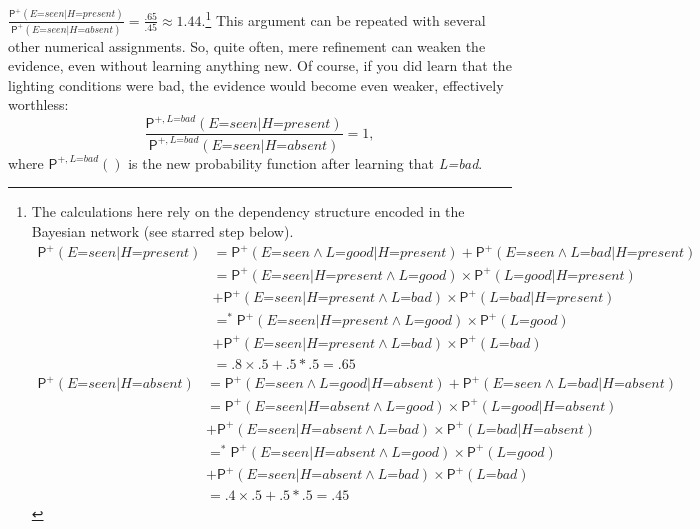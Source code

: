 \documentclass[
  11pt,
  dvipsnames,enabledeprecatedfontcommands]{scrartcl}
\newcommand{\ppr}[2]{\ensuremath{\mathsf{P}^{#1}(#2)}}
\begin{document}
\(\frac{\ppr{+}{\textit{E=seen} \vert \textit{H=present}}}{\ppr{+}{\textit{E=seen} \vert \textit{H=absent}}}=\frac{.65}{.45}\approx 1.44\).\footnote{The
  calculations here rely on the dependency structure encoded in the
  Bayesian network (see starred step below). \begin{align*}
  \ppr{+}{\textit{E=seen} \vert \textit{H=present}} &= \ppr{+}{\textit{E=seen} \wedge \textit{L=good} \vert \textit{H=present}}+\ppr{+}{\textit{E=seen} \wedge \textit{L=bad} \vert \textit{H=present}}\\
  &= \ppr{+}{\textit{E=seen} \vert \textit{H=present} \wedge \textit{L=good}}  \times \ppr{+}{\textit{L=good} \vert  \textit{H=present} }\\ & +\ppr{+}{\textit{E=seen}  \vert \textit{H=present} \wedge \textit{L=bad}} \times \ppr{+}{\textit{L=bad} \vert  \textit{H=present}}\\
  &=^* \ppr{+}{\textit{E=seen} \vert \textit{H=present} \wedge \textit{L=good}}  \times \ppr{+}{\textit{L=good}}\\ & +\ppr{+}{\textit{E=seen}  \vert \textit{H=present} \wedge \textit{L=bad}} \times \ppr{+}{\textit{L=bad}}\\
  &= .8 \times .5 +.5 *.5 = .65 
  \end{align*} \begin{align*}
  \ppr{+}{\textit{E=seen} \vert \textit{H=absent}} &= \ppr{+}{\textit{E=seen} \wedge \textit{L=good} \vert \textit{H=absent}}+\ppr{+}{\textit{E=seen} \wedge \textit{L=bad} \vert \textit{H=absent}}\\
  &= \ppr{+}{\textit{E=seen} \vert \textit{H=absent} \wedge \textit{L=good}}  \times \ppr{+}{\textit{L=good} \vert  \textit{H=absent} }\\ & +\ppr{+}{\textit{E=seen}  \vert \textit{H=absent} \wedge \textit{L=bad}} \times \ppr{+}{\textit{L=bad} \vert  \textit{H=absent}}\\
  &=^* \ppr{+}{\textit{E=seen} \vert \textit{H=absent} \wedge \textit{L=good}}  \times \ppr{+}{\textit{L=good}}\\ & +\ppr{+}{\textit{E=seen}  \vert \textit{H=absent} \wedge \textit{L=bad}} \times \ppr{+}{\textit{L=bad}}\\
  &= .4 \times .5 +.5 *.5 = .45 
  \end{align*}} This argument can be repeated with several other
numerical
assignments. So,
quite often, mere refinement can weaken the evidence, even without
learning anything new. Of course, if you did learn that the lighting
conditions were bad, the evidence would become even weaker, effectively
worthless:
\[\frac{\ppr{+, \textit{L=bad}}{\textit{E=seen} \vert \textit{H=present}}}{\ppr{+, \textit{L=bad}}{\textit{E=seen} \vert \textit{H=absent}}}=1,\]
where \(\ppr{+, \textit{L=bad}}{}\) is the new probability function
after learning that \textit{L=bad}.
\end{document}
